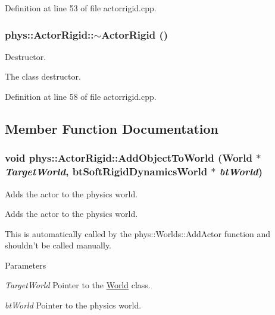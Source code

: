 Definition at line 53 of file actorrigid.cpp.

\hypertarget{classphys_1_1ActorRigid_ab317b5a2578157e54655a1aea8f4d058}{
\subsubsection[{$\sim$ActorRigid}]{\setlength{\rightskip}{0pt plus 5cm}phys::ActorRigid::$\sim$ActorRigid ()}}
\label{d8/d71/classphys_1_1ActorRigid_ab317b5a2578157e54655a1aea8f4d058}


Destructor. 

The class destructor. 

Definition at line 58 of file actorrigid.cpp.



\subsection{Member Function Documentation}
\hypertarget{classphys_1_1ActorRigid_a3c56eb06fe6a7d468b7a67c45ade7be4}{
\subsubsection[{AddObjectToWorld}]{\setlength{\rightskip}{0pt plus 5cm}void phys::ActorRigid::AddObjectToWorld ({\bf World} $\ast$ {\em TargetWorld}, \/  btSoftRigidDynamicsWorld $\ast$ {\em btWorld})}}
\label{d8/d71/classphys_1_1ActorRigid_a3c56eb06fe6a7d468b7a67c45ade7be4}


Adds the actor to the physics world. 

Adds the actor to the physics world. \par
 This is automatically called by the phys::Worlds::AddActor function and shouldn't be called manually. 
\begin{DoxyParams}{Parameters}
\item[{\em TargetWorld}]Pointer to the \hyperlink{classphys_1_1World}{World} class. \item[{\em btWorld}]Pointer to the physics world. \end{DoxyParams}


